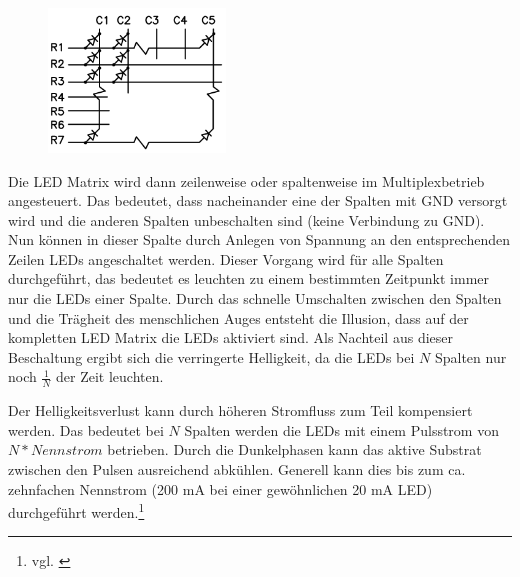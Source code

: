 \begin{figure}
  \vspace{-25pt}
  \begin{center}
    \includegraphics[width=0.42\textwidth]{skizzen/led_matrix_5x7.png}
  \end{center}
  \vspace{-20pt}
\end{figure}

Die LED Matrix
wird dann zeilenweise oder spaltenweise im Multiplexbetrieb angesteuert. Das bedeutet, dass nacheinander eine der Spalten mit GND versorgt wird und die anderen Spalten unbeschalten sind (keine Verbindung zu GND). Nun können in dieser Spalte durch Anlegen von Spannung an den entsprechenden Zeilen LEDs angeschaltet werden. 
Dieser Vorgang wird für alle Spalten durchgeführt, das bedeutet es leuchten zu
einem bestimmten Zeitpunkt immer nur die LEDs einer Spalte. Durch das schnelle
Umschalten zwischen den Spalten und die Trägheit des menschlichen Auges entsteht
die Illusion, dass auf der kompletten LED Matrix die LEDs aktiviert sind.
Als Nachteil aus dieser Beschaltung ergibt sich die verringerte Helligkeit, da
die LEDs bei $N$ Spalten nur noch $\frac{1}{N}$ der Zeit leuchten.

Der Helligkeitsverlust kann durch höheren Stromfluss zum Teil kompensiert
werden. Das bedeutet bei $N$ Spalten werden die LEDs mit einem Pulsstrom von
$N*Nennstrom$ betrieben. Durch die Dunkelphasen kann das aktive Substrat
zwischen den Pulsen ausreichend abkühlen. Generell kann dies bis zum ca.
zehnfachen Nennstrom (200 mA bei einer gewöhnlichen 20 mA LED) durchgeführt
werden.\footnote{vgl. \cite{ledMatrix}}

